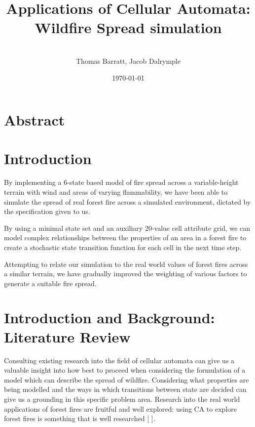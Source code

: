 \documentclass[11pt, a4paper, titlepage]{article}
\date{}
\title{ \textbf{Applications of Cellular Automata: Wildfire Spread simulation} \\  }
\author{\\ \Large{Thomas Barratt, Jacob Dalrymple  } }
\date{\today}
\begin{document}
\maketitle

\newpage

\section{Abstract}

\section{Introduction}
By implementing a 6-state based model of fire spread across a variable-height terrain with wind and areas of varying flammability, we have been able to simulate the spread of real forest fire across a simulated environment, dictated by the specification given to us.

By using a minimal state set and an auxiliary 20-value cell attribute grid, we can model complex relationships between the properties of an area in a forest fire to create a stochastic state transition function for each cell in the next time step.

Attempting to relate our simulation to the real world values of forest fires across a similar terrain, we have gradually improved the weighting of various factors to generate a suitable fire spread. 

\section{Introduction and Background: Literature Review}
Consulting existing research into the field of cellular automata can give us a valuable insight into how best to proceed when considering the formulation of a model which can describe the spread of wildfire. Considering what properties are being modelled and the ways in which transitions between state are decided can give us a grounding in this specific problem area. Research into the real world applications of forest fires are fruitful and well explored: using CA to explore forest fires is something that is well researched [\cite{ntinas2017parallel}
\cite{clarke1994cellular}
\cite{trunfio2011new}].
\end{document}
